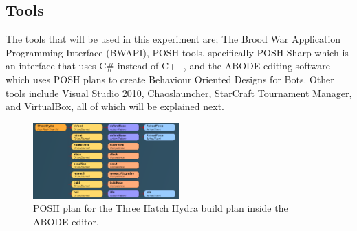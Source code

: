 \documentclass[journal]{IEEEtran}
\begin{document}
	\subsection{Tools}
	The tools that will be used in this experiment are; The Brood War Application Programming Interface (BWAPI), POSH tools, specifically POSH Sharp which is an interface that uses C\# instead of C++, and the ABODE editing software which uses POSH plans to create Behaviour Oriented Designs for Bots. Other tools include Visual Studio 2010, Chaoslauncher, StarCraft Tournament Manager, and VirtualBox, all of which will be explained next. 
	
	
	\begin{figure}[H]
		\centering
		\includegraphics[width=0.5\textwidth]{POSH}
		\caption{POSH plan for the Three Hatch Hydra build plan inside the ABODE editor.}
		\label{Fig1}
	\end{figure}
	
\end{document}
